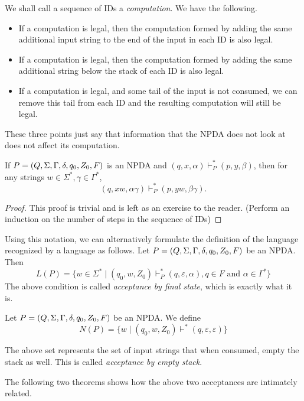 \vspace{3mm}
We shall call a sequence of IDs a \textit{computation}. We have the following.
\begin{itemize}
    \item If a computation is legal, then the computation formed by adding the same additional input string to the end of the input in each ID is also legal.
    \item If a computation is legal, then the computation formed by adding the same additional string below the stack of each ID is also legal.
    \item If a computation is legal, and some tail of the input is not consumed, we can remove this tail from each ID and the resulting computation will still be legal.
\end{itemize}

These three points just say that information that the NPDA does not look at does not affect its computation.

\begin{theorem}
\label{dontreaddontcare}
If $P=(Q,\Sigma,\Gamma,\delta,q_0,Z_0,F)$ is an NPDA and $(q,x,\alpha)\vdash^*_P(p,y,\beta)$, then for any strings $w\in\Sigma^*, \gamma\in\Gamma^*$, $$(q,xw,\alpha\gamma)\vdash^*_P(p,yw,\beta\gamma).$$
\end{theorem}
\begin{proof}
This proof is trivial and is left as an exercise to the reader. (Perform an induction on the number of steps in the sequence of IDs)
\end{proof}

Using this notation, we can alternatively formulate the definition of the language recognized by a language as follows.
Let $P=(Q,\Sigma,\Gamma,\delta,q_0,Z_0,F)$ be an NPDA. Then
$$L(P)=\{w\in \Sigma^* \mid (q_0,w,Z_0)\vdash^*_P(q,\varepsilon,\alpha), q\in F\text{ and }\alpha\in\Gamma^*\}$$
The above condition is called \textit{acceptance by final state}, which is exactly what it is.
\begin{definition}
Let $P=(Q,\Sigma,\Gamma,\delta,q_0,Z_0,F)$ be an NPDA. We define
$$N(P)=\{w\mid (q_0,w,Z_0)\vdash^*(q,\varepsilon,\varepsilon)\}$$
\end{definition}


The above set represents the set of input strings that when consumed, empty the stack as well. This is called \textit{acceptance by empty stack}.

The following two theorems shows how the above two acceptances are intimately related.

